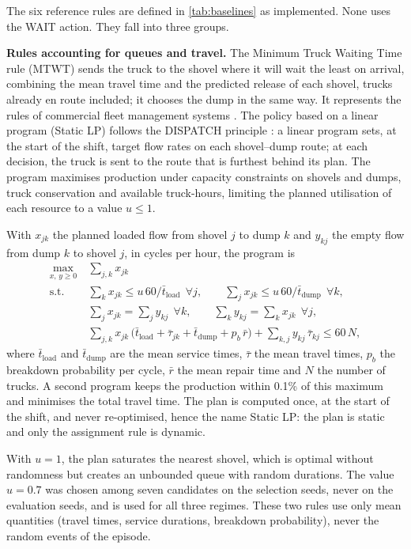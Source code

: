 \documentclass[11pt,a4paper]{article}
\newif\ifrevmarks
\newcommand{\revtag}[1]{\ifrevmarks\textsuperscript{\textcolor{red!70!black}{\scriptsize[#1]}}\fi}
\newenvironment{revbloc}[1]{\par\ifrevmarks\color{revcolor}\noindent\revtag{#1}\ \fi}{\par}
\newif\ifcorrmarks
\newcommand{\corr}[1]{\ifcorrmarks\textcolor{corrcolor}{#1}\else#1\fi}
\newenvironment{corrbloc}{\par\ifcorrmarks\color{corrcolor}\fi}{\par}
\begin{document}
\begin{revbloc}{M25, M16, Dir. corr. 1, A, v3}
The six reference rules are defined in \cref{tab:baselines} as implemented. None uses the WAIT action. They fall into three groups.

\textbf{Rules accounting for queues and travel.} The Minimum Truck Waiting Time rule (MTWT) sends the truck to the shovel where it will wait the least on arrival, combining the mean travel time and the predicted release of each shovel, trucks already en route included; it chooses the dump in the same way. It represents the rules of commercial fleet management systems \cite{Zeng2022}. The policy based on a linear program (\corr{Static LP}) follows the DISPATCH principle \cite{Soumis1989}: a linear program sets, at the start of the shift, target flow rates on each shovel--dump route; at each decision, the truck is sent to the route that is furthest behind its plan. The program maximises production under capacity constraints on shovels and dumps, truck conservation and available truck-hours, limiting the planned utilisation of each resource to a value $u \leq 1$.
\begin{corrbloc}
With $x_{jk}$ the planned loaded flow from shovel $j$ to dump $k$ and $y_{kj}$ the empty flow from dump $k$ to shovel $j$, in cycles per hour, the program is
\begin{align}
\max_{x,\,y \ge 0}\ & \textstyle\sum_{j,k} x_{jk} \label{eq:lp}\\
\text{s.t.}\ & \textstyle\sum_k x_{jk} \le u\,60/\bar t_{\mathrm{load}} \ \ \forall j, \qquad \sum_j x_{jk} \le u\,60/\bar t_{\mathrm{dump}} \ \ \forall k, \nonumber\\
& \textstyle\sum_j x_{jk} = \sum_j y_{kj} \ \ \forall k, \qquad \sum_k y_{kj} = \sum_k x_{jk} \ \ \forall j, \nonumber\\
& \textstyle\sum_{j,k} x_{jk}\,\big(\bar t_{\mathrm{load}} + \bar\tau_{jk} + \bar t_{\mathrm{dump}} + p_b\,\bar r\big) + \sum_{k,j} y_{kj}\,\bar\tau_{kj} \le 60\,N, \nonumber
\end{align}
where $\bar t_{\mathrm{load}}$ and $\bar t_{\mathrm{dump}}$ are the mean service times, $\bar\tau$ the mean travel times, $p_b$ the breakdown probability per cycle, $\bar r$ the mean repair time and $N$ the number of trucks. A second program keeps the production within 0.1\% of this maximum and minimises the total travel time. The plan is computed once, at the start of the shift, and never re-optimised, hence the name \corr{Static LP}: the plan is static and only the assignment rule is dynamic.
\end{corrbloc}
 With $u = 1$, the plan saturates the nearest shovel, which is optimal without randomness but creates an unbounded queue with random durations. The value $u = 0.7$ was chosen among seven candidates on the selection seeds, never on the evaluation seeds, and is used for all three regimes. These two rules use only mean quantities (travel times, service durations, breakdown probability), never the random events of the episode.


\end{revbloc}
\end{document}
